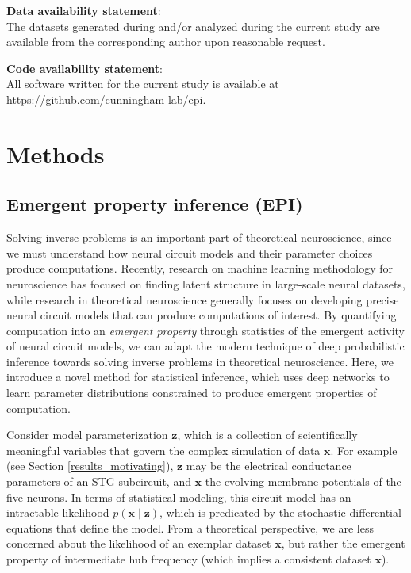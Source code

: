 \documentclass[11pt]{article}
\makeatletter
\newcommand\startsupplement{%
    \makeatletter 
       \setcounter{table}{0}
       \renewcommand{\thetable}{S\arabic\c@table}
       \setcounter{figure}{0}
       \renewcommand{\thefigure}{S\arabic{figure}}
    \makeatother}
\makeatother
\begin{document}
\textbf{Data availability statement}: \\
The datasets generated during and/or analyzed during the current study are available from the corresponding author upon reasonable request.

\textbf{Code availability statement}: \\
All software written for the current study is available at https://github.com/cunningham-lab/epi.




\newpage 
\startsupplement
\section{Methods}

\subsection{Emergent property inference (EPI)}\label{methods_EPI}
Solving inverse problems is an important part of theoretical neuroscience, since we must understand how neural circuit models and their parameter choices produce computations.
Recently, research on machine learning methodology for neuroscience has focused on finding latent structure in large-scale neural datasets, while research in theoretical neuroscience generally focuses on developing precise neural circuit models that can produce computations of interest.
By quantifying computation into an \emph{emergent property} through statistics of the emergent activity of neural circuit models, we can adapt the modern technique of deep probabilistic inference towards solving inverse problems in theoretical neuroscience.
Here, we introduce a novel method for statistical inference, which uses deep networks to learn parameter distributions constrained to produce emergent properties of computation.
 
Consider model parameterization $\mathbf{z}$, which is a collection of scientifically meaningful variables that govern the complex simulation of data $\mathbf{x}$.
For example (see Section \ref{results_motivating}), $\mathbf{z}$ may be the electrical conductance parameters of an STG subcircuit, and $\mathbf{x}$ the evolving membrane potentials of the five neurons.
In terms of statistical modeling, this circuit model has an intractable likelihood $p(\mathbf{x} \mid \mathbf{z})$, which is predicated by the stochastic differential equations that define the model.
From a theoretical perspective, we are less concerned about the likelihood of an exemplar dataset $\mathbf{x}$, but rather the emergent property of intermediate hub frequency (which implies a consistent dataset $\mathbf{x}$).
\end{document}
